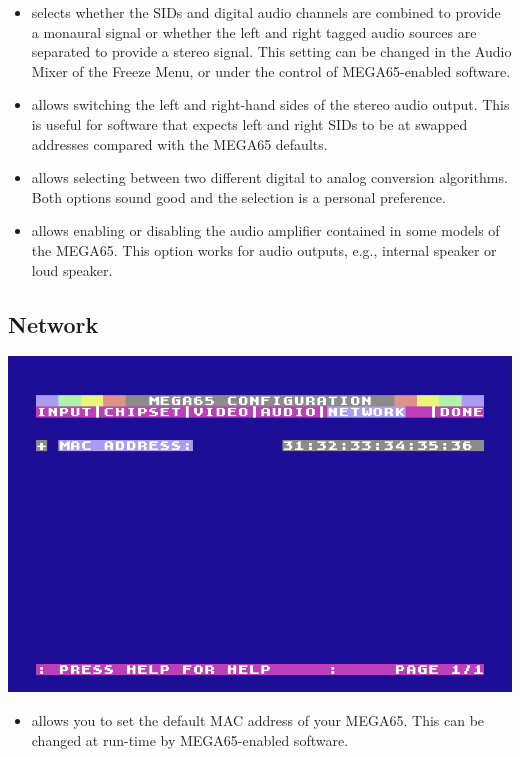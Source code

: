 \begin{itemize}
  \item {} selects whether the SIDs and digital audio channels are combined to provide a monaural signal or whether the left and right tagged audio sources are separated to provide a stereo signal. This setting can be changed in the Audio Mixer of the Freeze Menu, or under the control of MEGA65-enabled software.
  \item {} allows switching the left and right-hand sides of the stereo audio output. This is useful for software that expects left and right SIDs to be at swapped addresses compared with the MEGA65 defaults.
  \item {} allows selecting between two different digital to analog conversion algorithms. Both options sound good and the selection is a personal preference.
  \item {} allows enabling or disabling the audio amplifier contained in some models of the MEGA65. This option works for audio outputs, e.g., internal speaker or loud speaker.
\end{itemize}

\subsection{Network}

\begin{center}
\includegraphics[width=0.7\linewidth]{images/ss-m65config-5.png}
\end{center}

\begin{itemize}
  \item {} allows you to set the default MAC address of your MEGA65. This can be changed at run-time by MEGA65-enabled software.
\end{itemize}

